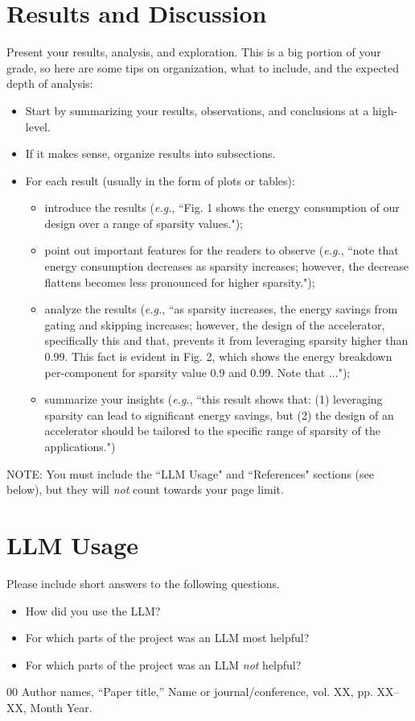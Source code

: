 \documentclass[conference]{IEEEtran}
\begin{document}
\section{Results and Discussion}
Present your results, analysis, and exploration. This is a big portion of your grade, so here are some tips on organization, what to include, and the expected depth of analysis:
\begin{itemize}
    \item Start by summarizing your results, observations, and conclusions at a high-level.
    \item If it makes sense, organize results into subsections.
    \item For each result (usually in the form of plots or tables):
    \begin{itemize}
        \item introduce the results (\emph{e.g.}, ``Fig. 1 shows the energy consumption of our design over a range of sparsity values.");
        \item point out important features for the readers to observe (\emph{e.g.}, ``note that energy consumption decreases as sparsity increases; however, the decrease flattens becomes less pronounced for higher sparsity.");
        \item analyze the results (\emph{e.g.}, ``as sparsity increases, the energy savings from gating and skipping increases; however, the design of the accelerator, specifically this and that, prevents it from leveraging sparsity higher than 0.99. This fact is evident in Fig. 2, which shows the energy breakdown per-component for sparsity value 0.9 and 0.99. Note that ...");
        \item summarize your insights (\emph{e.g.}, ``this result shows that: (1) leveraging sparsity can lead to significant energy savings, but (2) the design of an accelerator should be tailored to the specific range of sparsity of the applications.")
    \end{itemize}
\end{itemize}

\clearpage
NOTE: You must include the ``LLM Usage" and ``References" sections (see below), but they will \emph{not} count towards your page limit.

\section{LLM Usage}
Please include short answers to the following questions.

\begin{itemize}
    \item How did you use the LLM? 
    \item For which parts of the project was an LLM most helpful?
    \item For which parts of the project was an LLM \textit{not} helpful?
\end{itemize}

\begin{thebibliography}{00}
 Author names, ``Paper title,'' Name or journal/conference, vol. XX, pp. XX--XX, Month Year.
\end{thebibliography}
\end{document}
